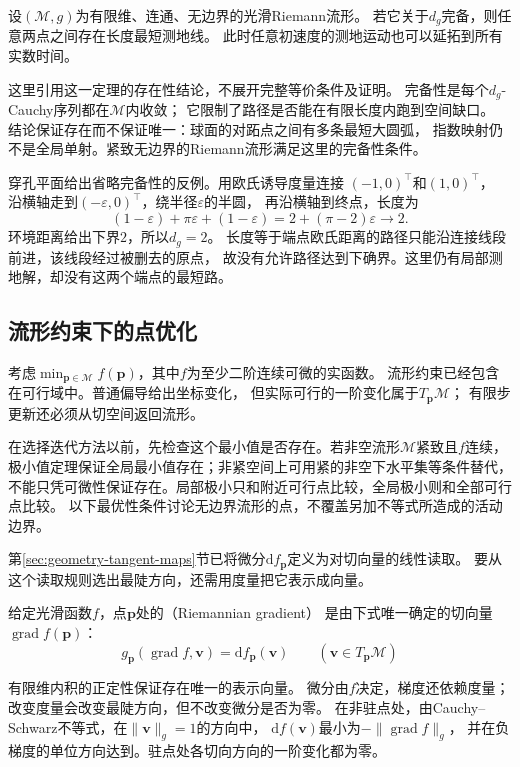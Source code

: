 \begin{theorem}
\label{thm:geometry-hopf-rinow-existence}
设$(\mathcal M,g)$为有限维、连通、无边界的光滑Riemann流形。
若它关于$d_g$完备，则任意两点之间存在长度最短测地线。
此时任意初速度的测地运动也可以延拓到所有实数时间。
\end{theorem}
这里引用这一定理的存在性结论，不展开完整等价条件及证明。
完备性是每个$d_g$-Cauchy序列都在$\mathcal M$内收敛；
它限制了路径是否能在有限长度内跑到空间缺口。
结论保证存在而不保证唯一：球面的对跖点之间有多条最短大圆弧，
指数映射仍不是全局单射。紧致无边界的Riemann流形满足这里的完备性条件。

穿孔平面给出省略完备性的反例。用欧氏诱导度量连接
$(-1,0)^\top$和$(1,0)^\top$，
沿横轴走到$(-\varepsilon,0)^\top$，绕半径$\varepsilon$的半圆，
再沿横轴到终点，长度为
\[
 (1-\varepsilon)+\pi\varepsilon+(1-\varepsilon)
 =2+(\pi-2)\varepsilon\longrightarrow2.
\]
环境距离给出下界$2$，所以$d_g=2$。
长度等于端点欧氏距离的路径只能沿连接线段前进，该线段经过被删去的原点，
故没有允许路径达到下确界。这里仍有局部测地解，却没有这两个端点的最短路。

\subsection{流形约束下的点优化}
\label{sec:geometry-point-optimization}
\label{sec:geometry-manifold-optimization}
\label{sec:geometry-point-optimality}

考虑$\min_{\bm p\in\mathcal M}f(\bm p)$，其中$f$为至少二阶连续可微的实函数。
流形约束已经包含在可行域中。普通偏导给出坐标变化，
但实际可行的一阶变化属于$T_{\bm p}\mathcal M$；
有限步更新还必须从切空间返回流形。


在选择迭代方法以前，先检查这个最小值是否存在。若非空流形$\mathcal M$紧致且$f$连续，
极小值定理保证全局最小值存在；非紧空间上可用紧的非空下水平集等条件替代，
不能只凭可微性保证存在。局部极小只和附近可行点比较，全局极小则和全部可行点比较。
以下最优性条件讨论无边界流形的点，不覆盖另加不等式所造成的活动边界。

第\ref{sec:geometry-tangent-maps}节已将微分$\mathrm df_{\bm p}$定义为对切向量的线性读取。
要从这个读取规则选出最陡方向，还需用度量把它表示成向量。
\begin{definition}[Riemann梯度]
\label{def:geometry-riemannian-gradient}
给定光滑函数$f$，点$\bm p$处的（Riemannian gradient）
是由下式唯一确定的切向量$\operatorname{grad}f(\bm p)$：
\begin{equation}
 g_{\bm p}(\operatorname{grad}f,\bm v)=\mathrm df_{\bm p}(\bm v)
 \qquad(\bm v\in T_{\bm p}\mathcal M)
 \label{eq:geometry-riemannian-gradient-definition}
\end{equation}
\end{definition}
有限维内积的正定性保证存在唯一的表示向量。
微分由$f$决定，梯度还依赖度量；改变度量会改变最陡方向，但不改变微分是否为零。
在非驻点处，由Cauchy--Schwarz不等式，在$\lVert\bm v\rVert_g=1$的方向中，
$\mathrm df(\bm v)$最小为$-\lVert\operatorname{grad}f\rVert_g$，
并在负梯度的单位方向达到。驻点处各切向方向的一阶变化都为零。


